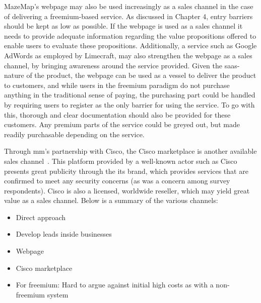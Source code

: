 MazeMap's webpage may also be used increasingly as a sales channel in the case of delivering a freemium-based service. As discussed in Chapter 4, entry barriers should be kept as low as possible. If the webpage is used as a sales channel it needs to provide adequate information regarding the value propositions offered to enable users to evaluate these propositions. Additionally, a service such as Google AdWords as employed by Limecraft, may also strengthen the webpage as a sales channel, by bringing awareness around the service provided. Given the \gls{saas}-nature of the product, the webpage can be used as a vessel to deliver the product to customers, and while users in the freemium paradigm do not purchase anything in the traditional sense of paying, the purchasing part could be handled by requiring users to register as the only barrier for using the service. To go with this, thorough and clear documentation should also be provided for these customers. Any premium parts of the service could be greyed out, but made readily purchasable depending on the service. 


Through \gls{mm}'s partnership with Cisco, the Cisco marketplace is another available sales channel~\cite{ciscomarket}. This platform provided by a well-known actor such as Cisco presents great publicity through the its brand, which provides services that are confirmed to meet any security concerns (as was a concern among survey respondents). Cisco is also a licensed, worldwide reseller, which may yield great value as a sales channel. Below is a summary of the various channels:


\begin{itemize}
    \item Direct approach
    \item Develop leads inside businesses
    \item Webpage
    \item Cisco marketplace
    \item For freemium: Hard to argue against initial high costs as with a non-freemium system
\end{itemize}

